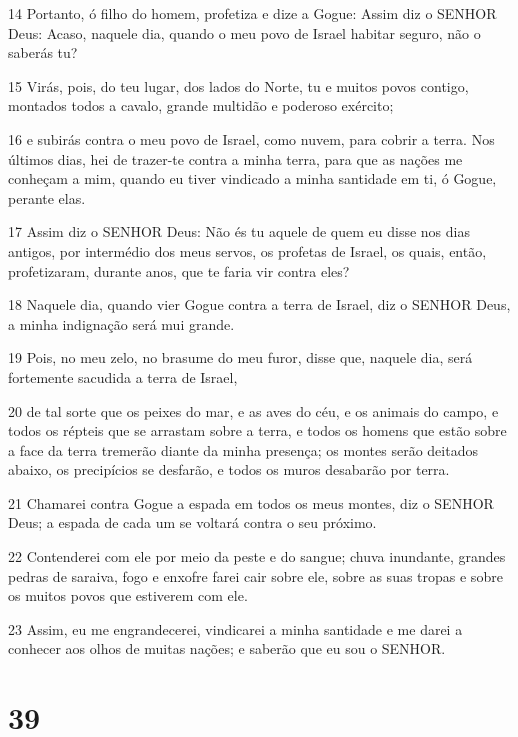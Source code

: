 \par 14 Portanto, ó filho do homem, profetiza e dize a Gogue: Assim diz o SENHOR Deus: Acaso, naquele dia, quando o meu povo de Israel habitar seguro, não o saberás tu?
\par 15 Virás, pois, do teu lugar, dos lados do Norte, tu e muitos povos contigo, montados todos a cavalo, grande multidão e poderoso exército;
\par 16 e subirás contra o meu povo de Israel, como nuvem, para cobrir a terra. Nos últimos dias, hei de trazer-te contra a minha terra, para que as nações me conheçam a mim, quando eu tiver vindicado a minha santidade em ti, ó Gogue, perante elas.
\par 17 Assim diz o SENHOR Deus: Não és tu aquele de quem eu disse nos dias antigos, por intermédio dos meus servos, os profetas de Israel, os quais, então, profetizaram, durante anos, que te faria vir contra eles?
\par 18 Naquele dia, quando vier Gogue contra a terra de Israel, diz o SENHOR Deus, a minha indignação será mui grande.
\par 19 Pois, no meu zelo, no brasume do meu furor, disse que, naquele dia, será fortemente sacudida a terra de Israel,
\par 20 de tal sorte que os peixes do mar, e as aves do céu, e os animais do campo, e todos os répteis que se arrastam sobre a terra, e todos os homens que estão sobre a face da terra tremerão diante da minha presença; os montes serão deitados abaixo, os precipícios se desfarão, e todos os muros desabarão por terra.
\par 21 Chamarei contra Gogue a espada em todos os meus montes, diz o SENHOR Deus; a espada de cada um se voltará contra o seu próximo.
\par 22 Contenderei com ele por meio da peste e do sangue; chuva inundante, grandes pedras de saraiva, fogo e enxofre farei cair sobre ele, sobre as suas tropas e sobre os muitos povos que estiverem com ele.
\par 23 Assim, eu me engrandecerei, vindicarei a minha santidade e me darei a conhecer aos olhos de muitas nações; e saberão que eu sou o SENHOR.

\chapter{39}

